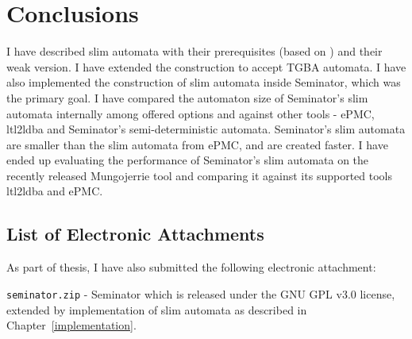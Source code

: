 \documentclass[
	digital,
nolof, nolot
]{fithesis3}
\begin{document}
	\chapter{Conclusions}
	
	I have described slim automata with their prerequisites (based on \cite{hlavni}) and their weak version.
	I have extended the construction to accept TGBA automata.
	I have also implemented the construction of slim automata inside Seminator, which was the primary goal.
	I have compared the automaton size of Seminator's slim automata internally among offered options and against other tools - ePMC, ltl2ldba and Seminator's semi-deterministic automata. Seminator's slim automata are smaller than the slim automata from ePMC, and are created faster.
	I have ended up evaluating the performance of Seminator's slim automata on the recently released Mungojerrie tool and comparing it against its supported tools ltl2ldba and ePMC.
	
	\begin{appendices}
	
	\chapter{List of Electronic Attachments}
	As part of thesis, I have also submitted the following electronic attachment:
	
	\texttt{seminator.zip} - Seminator which is released under the GNU GPL v3.0 license, extended by implementation of slim automata as described in Chapter~\ref{implementation}.
	\end{appendices}
\end{document}
